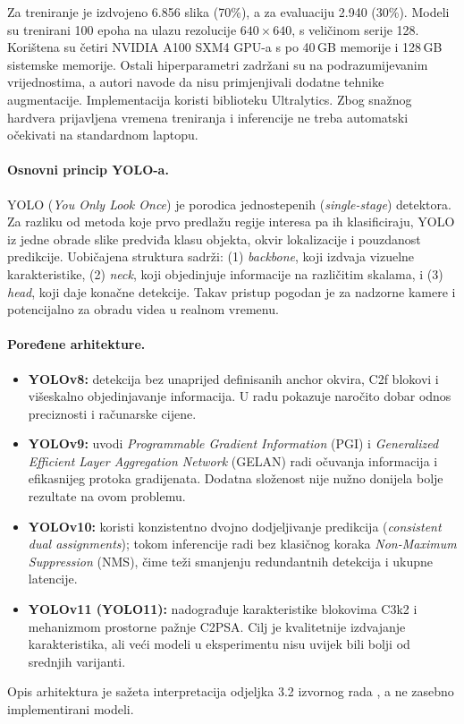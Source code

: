Za treniranje je izdvojeno 6.856 slika (70\%), a za evaluaciju 2.940 (30\%). Modeli su trenirani 100 epoha na ulazu rezolucije $640\times 640$, s veličinom serije 128. Korištena su četiri NVIDIA A100 SXM4 GPU-a s po 40\,GB memorije i 128\,GB sistemske memorije. Ostali hiperparametri zadržani su na podrazumijevanim vrijednostima, a autori navode da nisu primjenjivali dodatne tehnike augmentacije. Implementacija koristi biblioteku Ultralytics. Zbog snažnog hardvera prijavljena vremena treniranja i inferencije ne treba automatski očekivati na standardnom laptopu.

\paragraph{Osnovni princip YOLO-a.} YOLO (\emph{You Only Look Once}) je porodica jednostepenih (\emph{single-stage}) detektora. Za razliku od metoda koje prvo predlažu regije interesa pa ih klasificiraju, YOLO iz jedne obrade slike predviđa klasu objekta, okvir lokalizacije i pouzdanost predikcije. Uobičajena struktura sadrži: (1) \emph{backbone}, koji izdvaja vizuelne karakteristike, (2) \emph{neck}, koji objedinjuje informacije na različitim skalama, i (3) \emph{head}, koji daje konačne detekcije. Takav pristup pogodan je za nadzorne kamere i potencijalno za obradu videa u realnom vremenu.

\paragraph{Poređene arhitekture.}
\begin{itemize}
  \item \textbf{YOLOv8:} detekcija bez unaprijed definisanih anchor okvira, C2f blokovi i višeskalno objedinjavanje informacija. U radu pokazuje naročito dobar odnos preciznosti i računarske cijene.
  \item \textbf{YOLOv9:} uvodi \emph{Programmable Gradient Information} (PGI) i \emph{Generalized Efficient Layer Aggregation Network} (GELAN) radi očuvanja informacija i efikasnijeg protoka gradijenata. Dodatna složenost nije nužno donijela bolje rezultate na ovom problemu.
  \item \textbf{YOLOv10:} koristi konzistentno dvojno dodjeljivanje predikcija (\emph{consistent dual assignments}); tokom inferencije radi bez klasičnog koraka \emph{Non-Maximum Suppression} (NMS), čime teži smanjenju redundantnih detekcija i ukupne latencije.
  \item \textbf{YOLOv11 (YOLO11):} nadograđuje karakteristike blokovima C3k2 i mehanizmom prostorne pažnje C2PSA. Cilj je kvalitetnije izdvajanje karakteristika, ali veći modeli u eksperimentu nisu uvijek bili bolji od srednjih varijanti.
\end{itemize}
Opis arhitektura je sažeta interpretacija odjeljka 3.2 izvornog rada \cite{ramos}, a ne zasebno implementirani modeli.

